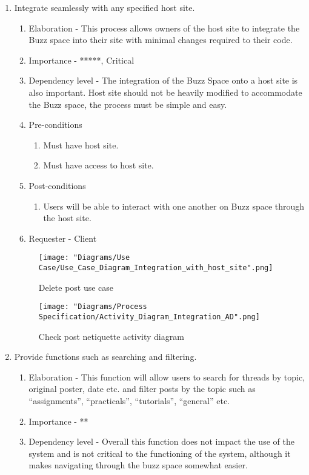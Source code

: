 \documentclass[12pt]{article}
\begin{document}
\begin{enumerate}
   \item Integrate seamlessly with any specified host site. %
	\begin{enumerate}
  		\item Elaboration - This process allows owners of the host site to integrate the Buzz space into their site with minimal changes required to their code.
   	 	\item Importance - *****, Critical
   	 	\item Dependency level - The integration of the Buzz Space onto a host site is also important. Host site should not be heavily modified to accommodate the Buzz space, the process must be simple and easy.
   	 	\item Pre-conditions
   		\begin{enumerate}
    		\item Must have host site.
    		\item Must have access to host site.
    	\end{enumerate}
     	\item Post-conditions
    	\begin{enumerate}
  	  		\item Users will be able to interact with one another on Buzz space through the host site.
   	 	\end{enumerate}
   	 	\item Requester - Client
	\end{enumerate}
  	\begin{figure}[h]
  		\centering
  		\texttt{[image: "Diagrams/Use Case/Use\_Case\_Diagram\_Integration\_with\_host\_site".png]}
  		\caption{Delete post use case}
  	\end{figure}
  	\begin{figure}[h]
  		\centering
  		\texttt{[image: "Diagrams/Process Specification/Activity\_Diagram\_Integration\_AD".png]}
  		\caption{Check post netiquette activity diagram}
  	\end{figure}
  	\clearpage
  	\newpage
\item Provide functions such as searching and filtering. %
  \begin{enumerate}
    \item Elaboration - This function will allow users to search for threads by topic, original poster, date etc. and filter posts by the topic such as “assignments”, “practicals”, “tutorials”, “general” etc.
    \item Importance - **
    \item Dependency level - Overall this function does not impact the use of the system and is not critical to the functioning of the system, although it makes navigating through the buzz space somewhat easier.

\end{enumerate}
\end{enumerate}
\end{document}
